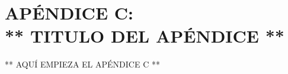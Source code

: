 \chapter*{APÉNDICE C:\\ ** TITULO DEL APÉNDICE **}
\thispagestyle{empty}

** AQUÍ EMPIEZA EL APÉNDICE C **
